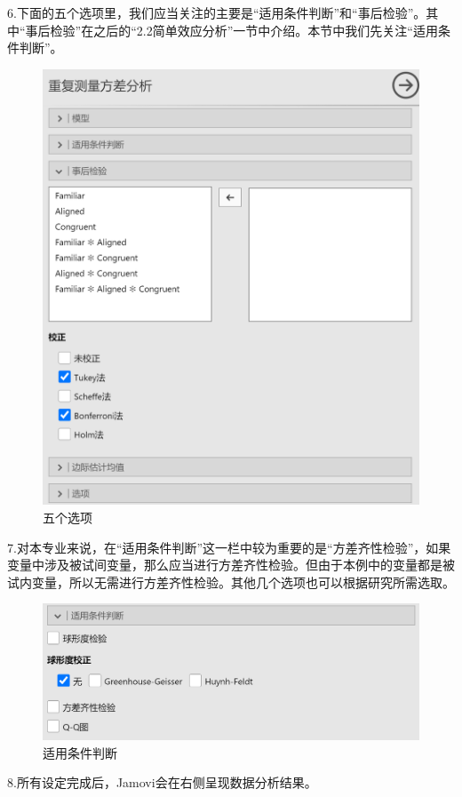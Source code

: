 \documentclass[]{ctexbook}
\theoremstyle{definition}
\theoremstyle{definition}
\theoremstyle{definition}
\theoremstyle{definition}
\theoremstyle{remark}
\begin{document}
6.下面的五个选项里，我们应当关注的主要是``适用条件判断''和``事后检验''。其中``事后检验''在之后的``2.2简单效应分析''一节中介绍。本节中我们先关注``适用条件判断''。

\begin{figure}

{\centering \includegraphics[width=0.6\linewidth]{img/jamovi/rmanova-posthoc} 

}

\caption{五个选项}\label{fig:jamovi-rmanova-posthoc1}
\end{figure}

7.对本专业来说，在``适用条件判断''这一栏中较为重要的是``方差齐性检验''，如果变量中涉及被试间变量，那么应当进行方差齐性检验。但由于本例中的变量都是被试内变量，所以无需进行方差齐性检验。其他几个选项也可以根据研究所需选取。

\begin{figure}

{\centering \includegraphics[width=0.6\linewidth]{img/jamovi/rmanova-sphericity} 

}

\caption{适用条件判断}\label{fig:jamovi-rmanova-sphericity}
\end{figure}

8.所有设定完成后，Jamovi会在右侧呈现数据分析结果。
\end{document}
